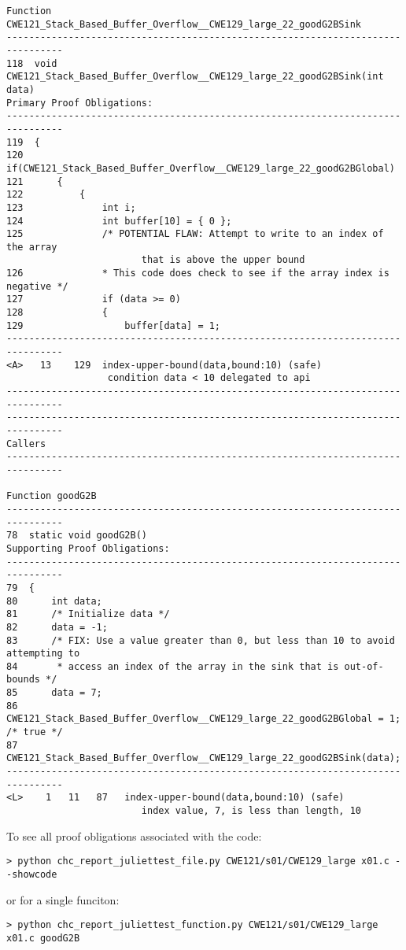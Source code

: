 \documentclass[11pt]{article}
\begin{document}
\begin{scriptsize}
\begin{verbatim}
Function CWE121_Stack_Based_Buffer_Overflow__CWE129_large_22_goodG2BSink
--------------------------------------------------------------------------------
118  void CWE121_Stack_Based_Buffer_Overflow__CWE129_large_22_goodG2BSink(int data)
Primary Proof Obligations:
--------------------------------------------------------------------------------
119  {
120      if(CWE121_Stack_Based_Buffer_Overflow__CWE129_large_22_goodG2BGlobal)
121      {
122          {
123              int i;
124              int buffer[10] = { 0 };
125              /* POTENTIAL FLAW: Attempt to write to an index of the array 
                        that is above the upper bound
126              * This code does check to see if the array index is negative */
127              if (data >= 0)
128              {
129                  buffer[data] = 1;
--------------------------------------------------------------------------------
<A>   13    129  index-upper-bound(data,bound:10) (safe)
                  condition data < 10 delegated to api
--------------------------------------------------------------------------------
--------------------------------------------------------------------------------
Callers
--------------------------------------------------------------------------------

Function goodG2B
--------------------------------------------------------------------------------
78  static void goodG2B()
Supporting Proof Obligations:
--------------------------------------------------------------------------------
79  {
80      int data;
81      /* Initialize data */
82      data = -1;
83      /* FIX: Use a value greater than 0, but less than 10 to avoid attempting to
84       * access an index of the array in the sink that is out-of-bounds */
85      data = 7;
86      CWE121_Stack_Based_Buffer_Overflow__CWE129_large_22_goodG2BGlobal = 1; /* true */
87      CWE121_Stack_Based_Buffer_Overflow__CWE129_large_22_goodG2BSink(data);
--------------------------------------------------------------------------------
<L>    1   11   87   index-upper-bound(data,bound:10) (safe)
                        index value, 7, is less than length, 10
\end{verbatim}
\end{scriptsize}

To see all proof obligations associated with the code:
\begin{verbatim}
> python chc_report_juliettest_file.py CWE121/s01/CWE129_large x01.c --showcode
\end{verbatim}
or for a single funciton:
\begin{verbatim}
> python chc_report_juliettest_function.py CWE121/s01/CWE129_large x01.c goodG2B
\end{verbatim}
\end{document}
